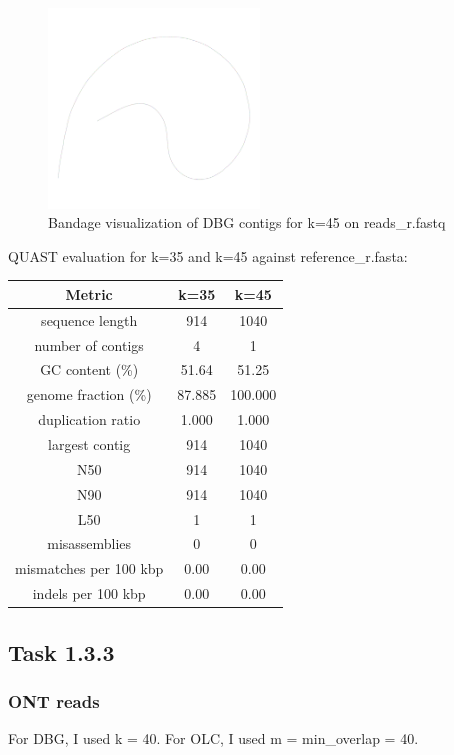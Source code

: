 \documentclass[12pt]{article}
\begin{document}
\begin{figure}[h]
    \centering
    \includegraphics[width=0.5\textwidth]{../toy_dataset/r-k-45.png}
    \caption{Bandage visualization of DBG contigs for k=45 on reads\_r.fastq}
\end{figure} 

QUAST evaluation for k=35 and k=45 against reference\_r.fasta:

\begin{center}
\begin{tabular}{ |c|c|c| }
    \hline
    Metric & k=35 & k=45 \\
    \hline
    sequence length & 914 & 1040 \\
    number of contigs & 4 & 1 \\
    GC content (\%) & 51.64 & 51.25 \\
    genome fraction (\%) & 87.885 & 100.000 \\
    duplication ratio & 1.000 & 1.000 \\
    largest contig & 914 & 1040 \\
    N50 & 914 & 1040 \\
    N90 & 914 & 1040 \\
    L50 & 1 & 1 \\
    misassemblies & 0 & 0 \\
    mismatches per 100 kbp & 0.00 & 0.00 \\
    indels per 100 kbp & 0.00 & 0.00 \\
    \hline
\end{tabular}
\end{center}


\subsection{Task 1.3.3}

\subsubsection{ONT reads}
For DBG, I used k = 40. For OLC, I used m = min\_overlap = 40.
\end{document}
